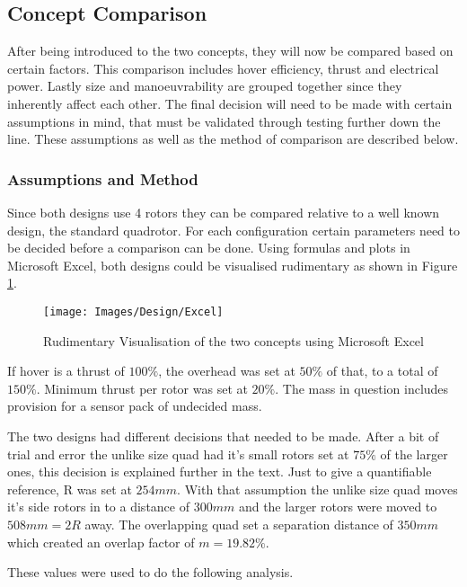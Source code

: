 		\subsection{Concept Comparison}
		After being introduced to the two concepts, they will now be compared based on certain factors. This comparison includes hover efficiency, thrust and electrical power. Lastly size and manoeuvrability are grouped together since they inherently affect each other. The final decision will need to be made with certain assumptions in mind, that must be validated through testing further down the line. These assumptions as well as the method of comparison are described below. 
	
			\subsubsection{Assumptions and Method}
			Since both designs use 4 rotors they can be compared relative to a well known design, the standard quadrotor. For each configuration certain parameters need to be decided before a comparison can be done. Using formulas and plots in Microsoft Excel\texttrademark, both designs could be visualised rudimentary as shown in Figure \ref{IM_Excel}.
			
			\begin{figure}[H]
			\centering
			\texttt{[image: Images/Design/Excel]}
			\caption{Rudimentary Visualisation of the two concepts using Microsoft Excel\texttrademark}
			\label{IM_Excel}
			\end{figure}
			
			If hover is a thrust of $100\%$, the overhead was set at $50\%$  of that, to a total of $150\%$. Minimum thrust per rotor was set at $20\%$. The mass in question includes provision for a sensor pack of undecided mass. 
			
			The two designs had different decisions that needed to be made. After a bit of trial and error the unlike size quad had it's small rotors set at $75\%$ of the larger ones, this decision is explained further in the text. Just to give a quantifiable reference, R was set at $254mm$. With that assumption the unlike size quad moves it's side rotors in to a distance of $300mm$ and the larger rotors were moved to $508mm = 2R$ away. The overlapping quad set a separation distance of $350mm$ which created an overlap factor of $m = 19.82\%$. 
			
			These values were used to do the following analysis.
	
